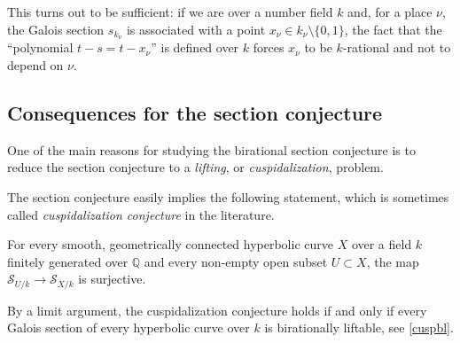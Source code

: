 \documentclass[11pt]{amsart}
\theoremstyle{plain}
\theoremstyle{definition}
\newcommand{\on}{\operatorname}
\newcommand{\1}{\mathbb{1}}
\newcommand{\hz}{\hat{\mathbb{Z}}}
\newcommand{\mc}{\mathcal}
\newcommand{\Q}{\mathbb{Q}}
\renewcommand{\H}{\on{H}}
\renewcommand{\P}{\mathbb{P}}
\renewcommand{\hat}{\widehat}
\begin{document}

This turns out to be sufficient: if we are over a number field $k$ and, for a place $\nu$, the Galois section $s_{k_{\nu}}$ is associated with a point $x_{\nu}\in k_{\nu}\setminus\{0,1\}$, the fact that the ``polynomial $t-s=t-x_{\nu}$'' is defined over $k$ forces $x_{\nu}$ to be $k$-rational and not to depend on $\nu$.




\subsection{Consequences for the section conjecture}

One of the main reasons for studying the birational section conjecture is to reduce the section conjecture to a \emph{lifting}, or \emph{cuspidalization}, problem.

The section conjecture easily implies the following statement, which is sometimes called \emph{cuspidalization conjecture} in the literature.

\begin{CC}
    For every smooth, geometrically connected hyperbolic curve $X$ over a field $k$ finitely generated over $\Q$ and every non-empty open subset $U\subset X$, the map $\mc{S}_{U/k}\to\mc{S}_{X/k}$ is surjective.
\end{CC}

By a limit argument, the cuspidalization conjecture holds if and only if every Galois section of every hyperbolic curve over $k$ is birationally liftable, see \autoref{cuspbl}.
\end{document}

